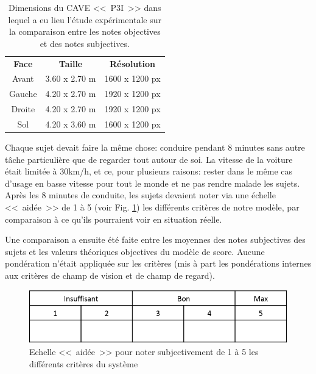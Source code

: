 	\begin{table}[h]
		\centering
		\caption{Dimensions du CAVE <<~P3I~>> dans lequel a eu lieu l'étude expérimentale sur la comparaison entre les notes objectives et des notes subjectives.}
		\label{tab:cave_dimensions}
		\small
		\begin{tabular}{ccc}
			\multicolumn{1}{c}{\bfseries Face} & \multicolumn{1}{c}{\bfseries Taille} & \multicolumn{1}{c}{\bfseries Résolution}\\
			Avant & 3.60 x 2.70 m & 1600 x 1200 px\\
			Gauche & 4.20 x 2.70 m & 1920 x 1200 px\\
			Droite & 4.20 x 2.70 m & 1920 x 1200 px\\
			Sol & 4.20 x 3.60 m & 1600 x 1200 px\\
		\end{tabular}
	\end{table}
	 
	 \par Chaque sujet devait faire la même chose: conduire pendant 8 minutes sans autre tâche particulière que de regarder tout autour de soi. La vitesse de la voiture était limitée à 30km/h, et ce, pour plusieurs raisons: rester dans le même cas d'usage en basse vitesse pour tout le monde et ne pas rendre malade les sujets. Après les 8 minutes de conduite, les sujets devaient noter via une échelle <<~aidée~>> de 1 à 5 (voir Fig. \ref{fig:aided_scale}) les différents critères de notre modèle, par comparaison à ce qu'ils pourraient voir en situation réelle.
	 
	 \par Une comparaison a ensuite été faite entre les moyennes des notes subjectives des sujets et les valeurs théoriques objectives du modèle de score. Aucune pondération n'était appliquée sur les critères (mis à part les pondérations internes aux critères de champ de vision et de champ de regard).
	
	\begin{figure}[h]
		\centering
		\includegraphics[scale=1]{Figures/AidedScale}
		\caption{Echelle <<~aidée~>> pour noter subjectivement de 1 à 5 les différents critères du système}
		\label{fig:aided_scale}
	\end{figure}
	
